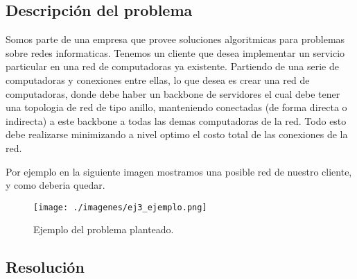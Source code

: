 \subsection{Descripci\'on del problema}

Somos parte de una empresa que provee soluciones algoritmicas para problemas sobre redes informaticas. Tenemos un cliente que desea implementar un servicio particular en una red de computadoras ya existente.
Partiendo de una serie de computadoras y conexiones entre ellas, lo que desea es crear una red de computadoras, donde debe haber un backbone de servidores el cual debe tener una topologia de red de tipo anillo, manteniendo conectadas (de forma directa o indirecta) a este backbone a todas las demas computadoras de la red.
Todo esto debe realizarse minimizando a nivel optimo el costo total de las conexiones de la red.

Por ejemplo en la siguiente imagen mostramos una posible red de nuestro cliente, y como deberia quedar.

\begin{figure}[H]
\begin{center}
\texttt{[image: ./imagenes/ej3\_ejemplo.png]}
\caption{Ejemplo del problema planteado.}
\end{center}
\end{figure}


\newpage


\subsection{Resoluci\'on}

